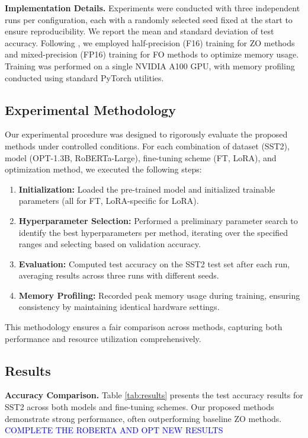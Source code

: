 \documentclass{article}
\theoremstyle{plain}
\theoremstyle{definition}
\theoremstyle{remark}
\begin{document}
\textbf{Implementation Details.} Experiments were conducted with three independent runs per configuration, each with a randomly selected seed fixed at the start to ensure reproducibility. We report the mean and standard deviation of test accuracy. Following \cite{malladi2023fine}, we employed half-precision (F16) training for ZO methods and mixed-precision (FP16) training for FO methods to optimize memory usage. Training was performed on a single NVIDIA A100 GPU, with memory profiling conducted using standard PyTorch utilities.

\subsection{Experimental Methodology}

Our experimental procedure was designed to rigorously evaluate the proposed methods under controlled conditions. For each combination of dataset (SST2), model (OPT-1.3B, RoBERTa-Large), fine-tuning scheme (FT, LoRA), and optimization method, we executed the following steps:
\begin{enumerate}
    \item \textbf{Initialization:} Loaded the pre-trained model and initialized trainable parameters (all for FT, LoRA-specific for LoRA).
    \item \textbf{Hyperparameter Selection:} Performed a preliminary parameter search to identify the best hyperparameters per method, iterating over the specified ranges and selecting based on validation accuracy.
    \item \textbf{Evaluation:} Computed test accuracy on the SST2 test set after each run, averaging results across three runs with different seeds.
    \item \textbf{Memory Profiling:} Recorded peak memory usage during training, ensuring consistency by maintaining identical hardware settings.
\end{enumerate}


This methodology ensures a fair comparison across methods, capturing both performance and resource utilization comprehensively.

\subsection{Results}

\textbf{Accuracy Comparison.} Table \ref{tab:results} presents the test accuracy results for SST2 across both models and fine-tuning schemes. Our proposed methods demonstrate strong performance, often outperforming baseline ZO methods. \textcolor{blue}{COMPLETE THE ROBERTA AND OPT NEW RESULTS}
\end{document}

